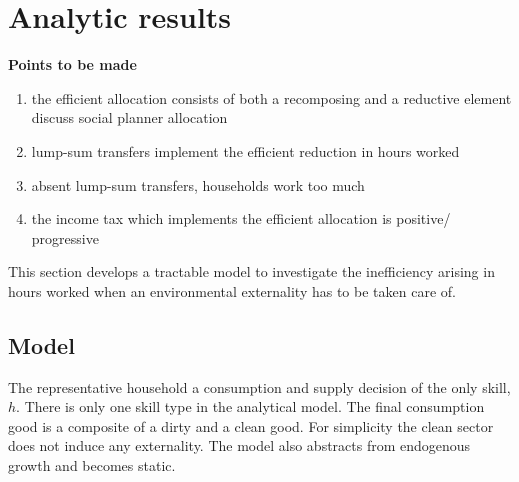 \section{Analytic results}
\textbf{Points to be made}
\begin{enumerate}
\item the efficient allocation consists of both a recomposing and a reductive element \ar discuss social planner allocation
\item lump-sum transfers implement the efficient reduction in hours worked \checkmark
\item absent lump-sum transfers, households work too much \checkmark
\item the income tax which implements the efficient allocation is positive/ progressive \checkmark
\end{enumerate}

This section develops a tractable model to investigate the inefficiency arising in hours worked when an environmental externality has to be taken care of. 

\subsection{Model}
The representative household a consumption and supply decision of the only skill, $h$. There is only one skill type in the analytical model. The final consumption good is a composite of a dirty and a clean good. For simplicity the clean sector does not induce any externality. The model also abstracts from endogenous growth and becomes static. 




